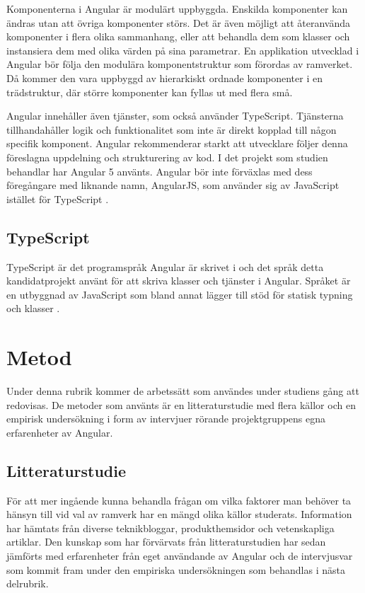 Komponenterna i Angular är modulärt uppbyggda. Enskilda komponenter kan ändras utan att övriga komponenter störs. Det är även möjligt att återanvända komponenter i flera olika sammanhang, eller att behandla dem som klasser och instansiera dem med olika värden på sina parametrar. En applikation utvecklad i Angular bör följa den modulära komponentstruktur som förordas av ramverket. Då kommer den vara uppbyggd av hierarkiskt ordnade komponenter i en trädstruktur, där större komponenter kan fyllas ut med flera små.   

Angular innehåller även tjänster, som också använder TypeScript. Tjänsterna tillhandahåller logik och funktionalitet som inte är direkt kopplad till någon specifik komponent. Angular rekommenderar starkt att utvecklare följer denna föreslagna uppdelning och strukturering av kod. I det projekt som studien behandlar har Angular 5 använts. Angular bör inte förväxlas med dess föregångare med liknande namn, AngularJS, som använder sig av JavaScript istället för TypeScript \cite{angularguide}.


\subsection{TypeScript}

TypeScript är det programspråk Angular är skrivet i och det språk detta kandidatprojekt använt för att skriva klasser och tjänster i Angular. Språket är en utbyggnad av JavaScript som bland annat lägger till stöd för statisk typning och klasser \cite{henrik_ts1}.


\section{Metod}

Under denna rubrik kommer de arbetssätt som användes under studiens gång att redovisas. De metoder som använts är en litteraturstudie med flera källor och en empirisk undersökning i form av intervjuer rörande projektgruppens egna erfarenheter av Angular.

\subsection{Litteraturstudie}

För att mer ingående kunna behandla frågan om vilka faktorer man behöver ta hänsyn till vid val av ramverk har en mängd olika källor studerats. Information har hämtats från diverse teknikbloggar, produkthemsidor och vetenskapliga artiklar. Den kunskap som har förvärvats från litteraturstudien har sedan jämförts med erfarenheter från eget användande av Angular och de intervjusvar som kommit fram under den empiriska undersökningen som behandlas i nästa delrubrik.

